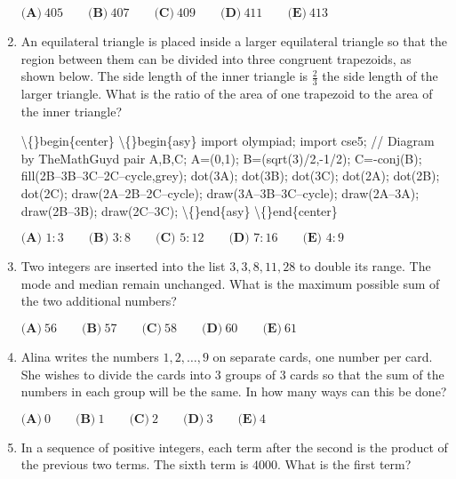 \documentclass{article}
\begin{document}
\begin{enumerate}[label=\arabic*., itemsep=0.5em]
\(\textbf{(A)}\ 405 \qquad \textbf{(B)}\ 407 \qquad \textbf{(C)}\ 409 \qquad \textbf{(D)}\ 411 \qquad \textbf{(E)}\ 413\)\par \vspace{0.5em}\item An equilateral triangle is placed inside a larger equilateral triangle so that the region between them can be divided into three congruent trapezoids, as shown below. The side length of the inner triangle is \(\frac23\) the side length of the larger triangle. What is the ratio of the area of one trapezoid to the area of the inner triangle?


\textbackslash\{\}begin\{center\}
\textbackslash\{\}begin\{asy\}
import olympiad;
import cse5;
// Diagram by TheMathGuyd 
pair A,B,C;
A=(0,1);
B=(sqrt(3)/2,-1/2);
C=-conj(B);
fill(2B--3B--3C--2C--cycle,grey);
dot(3A);
dot(3B);
dot(3C);
dot(2A);
dot(2B);
dot(2C);
draw(2A--2B--2C--cycle);
draw(3A--3B--3C--cycle);
draw(2A--3A);
draw(2B--3B);
draw(2C--3C);
\textbackslash\{\}end\{asy\}
\textbackslash\{\}end\{center\}


\(\textbf{(A) } 1 : 3 \qquad \textbf{(B) } 3 : 8 \qquad \textbf{(C) } 5 : 12 \qquad \textbf{(D) } 7 : 16 \qquad \textbf{(E) } 4 : 9\)\par \vspace{0.5em}\item Two integers are inserted into the list \(3,3,8,11,28\) to double its range. The mode and median remain unchanged. What is the maximum possible sum of the two additional numbers?

\(\textbf{(A)}\ 56 \qquad \textbf{(B)}\ 57 \qquad \textbf{(C)}\ 58 \qquad \textbf{(D)}\ 60 \qquad \textbf{(E)}\ 61\)\par \vspace{0.5em}\item Alina writes the numbers \(1, 2, \dots , 9\) on separate cards, one number per card. She wishes to divide the cards into \(3\) groups of \(3\) cards so that the sum of the numbers in each group will be the same. In how many ways can this be done?

\(\textbf{(A)}\ 0 \qquad \textbf{(B)}\ 1 \qquad \textbf{(C)}\ 2 \qquad \textbf{(D)}\ 3 \qquad \textbf{(E)}\ 4\)\par \vspace{0.5em}\item In a sequence of positive integers, each term after the second is the product of the previous two terms. The sixth term is \(4000\). What is the first term?


\end{enumerate}
\end{document}
